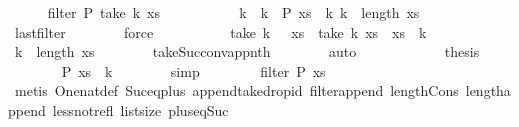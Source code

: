 \begin{isabellebody}
{\isacharminus}\isanewline
\ \ \ \ \isamarkupfalse%
\ {\isachardoublequoteopen}filter\ P\ {\isacharparenleft}take\ k{}\ xs{\isacharparenright}\ {\isacharequal}\ {\isacharbrackleft}{\isacharbrackright}{\isachardoublequoteclose}\isanewline
\ \ \ \ \ \ \isamarkupfalse%
\ {\isacharbackquoteopen}{\isasymforall}\ k{\isacharprime}\ {\isacharless}\ k{}{\isachardot}\ {\isasymnot}\ P\ {\isacharparenleft}xs\ {\isacharbang}\ k{\isacharprime}{\isacharparenright}{\isacharbackquoteclose}\ {\isacharbackquoteopen}k{}\ {\isacharless}\ length\ xs{\isacharbackquoteclose}\isanewline
\ \ \ \ \ \ \isamarkupfalse%
\ last{\isacharunderscore}filter\isanewline
\ \ \ \ \ \ \isamarkupfalse%
\ force\isanewline
\ \ \ \ \isamarkupfalse%
\isanewline
\ \ \ \ \isamarkupfalse%
\ {\isachardoublequoteopen}take\ {\isacharparenleft}k{}\ {\isacharplus}\ {}{\isacharparenright}\ xs\ {\isacharequal}\ take\ k{}\ xs\ {\isacharat}\ {\isacharbrackleft}xs\ {\isacharbang}\ k{}{\isacharbrackright}{\isachardoublequoteclose}\isanewline
\ \ \ \ \ \ \isamarkupfalse%
\ {\isacharbackquoteopen}k{}\ {\isacharless}\ length\ xs{\isacharbackquoteclose}\isanewline
\ \ \ \ \ \ \isamarkupfalse%
\ take{\isacharunderscore}Suc{\isacharunderscore}conv{\isacharunderscore}app{\isacharunderscore}nth\isanewline
\ \ \ \ \ \ \isamarkupfalse%
\ auto\isanewline
\ \ \ \ \isamarkupfalse%
\ \isanewline
\ \ \ \ \isamarkupfalse%
\ {\isacharquery}thesis\isanewline
\ \ \ \ \ \ \isamarkupfalse%
\ {\isacharbackquoteopen}P\ {\isacharparenleft}xs\ {\isacharbang}\ k{}{\isacharparenright}{\isacharbackquoteclose}\isanewline
\ \ \ \ \ \ \isamarkupfalse%
\ simp\isanewline
\ \ \isamarkupfalse%
\isanewline
\ \ \isamarkupfalse%
\ \isamarkupfalse%
\ {\isachardoublequoteopen}filter\ P\ {\isacharquery}xs\ {\isasymnoteq}\ {\isacharbrackleft}{\isacharbrackright}{\isachardoublequoteclose}\isanewline
\ \ \ \ \isamarkupfalse%
\ {}\isanewline
\ \ \ \ \isamarkupfalse%
\ {\isacharparenleft}metis\ One{\isacharunderscore}nat{\isacharunderscore}def\ Suc{\isacharunderscore}eq{\isacharunderscore}plus{}\ append{\isacharunderscore}take{\isacharunderscore}drop{\isacharunderscore}id\ filter{\isacharunderscore}append\ length{\isacharunderscore}Cons\ length{\isacharunderscore}append\ less{\isacharunderscore}not{\isacharunderscore}refl{}\ list{\isachardot}size{\isacharparenleft}{}{\isacharparenright}\ plus{\isacharunderscore}{}{\isacharunderscore}eq{\isacharunderscore}Suc{\isacharparenright}\isanewline

\end{isabellebody}
